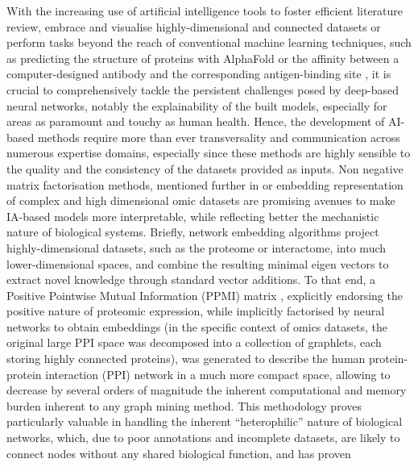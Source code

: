 \documentclass[mainlanguage=english,numlaboratories=2, nofrontcover=true,noaim=false, localbibs, colophon-location=verso-frontcover, oneside, 10pt, localtocs, version=final, nomakeabstract=true]{yathesis}
\begin{document}

With the increasing use of artificial intelligence tools to foster efficient literature review, embrace and visualise highly-dimensional and connected datasets or perform tasks beyond the reach of conventional machine learning techniques, such as predicting the structure of proteins with AlphaFold \autocite{jumper_etal21} or the affinity between a computer-designed antibody and the corresponding antigen-binding site \autocite{kuroda_etal12}, it is crucial to comprehensively tackle the persistent challenges posed by deep-based neural networks, notably the explainability of the built models, especially for areas as paramount and touchy as human health\autocite{aittokallio22}. Hence, the development of AI-based methods require more than ever transversality and communication across numerous expertise domains, especially since these methods are highly sensible to the quality and the consistency of the datasets provided as inputs. Non negative matrix factorisation methods, mentioned further in  or embedding representation of complex and high dimensional omic datasets \autocite{doria-belenguer_etal23} \autocite{xenos_etal21} are promising avenues to make IA-based models more interpretable, while reflecting better the mechanistic nature of biological systems. Briefly, network embedding algorithms project highly-dimensional datasets, such as the proteome or interactome, into much lower-dimensional spaces, and combine the resulting minimal eigen vectors to extract novel knowledge through standard vector additions. To that end, a Positive Pointwise Mutual Information (PPMI) matrix \autocite{xenos_etal21}, explicitly endorsing the positive nature of proteomic expression, while implicitly factorised by neural networks to obtain embeddings (in the specific context of omics datasets, the original large PPI space was decomposed into a collection of graphlets, each storing highly connected proteins), was generated to describe the human protein-protein interaction (PPI) network in a much more compact space, allowing to decrease by several orders of magnitude the inherent computational and memory burden inherent to any graph mining method. This methodology proves particularly valuable in handling the inherent \enquote{heterophilic} nature of biological networks, which, due to poor annotations and incomplete datasets, are likely to connect nodes without any shared biological function, and has proven 
\end{document}
